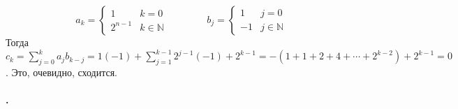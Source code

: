 \documentclass{article}
\begin{document}
\begin{itemize}
\begin{Example}
            $$a_k=\begin{cases}
                1 & k=0\\
                2^{n-1} & k\in\mathbb N
            \end{cases}\qquad\qquad b_j=\begin{cases}
                1 & j=0\\
                -1 & j\in\mathbb N
            \end{cases}$$
            Тогда $c_k=\sum\limits_{j=0}^k a_jb_{k-j}=1(-1)+\sum\limits_{j=1}^{k-1}2^{j-1}(-1)+2^{k-1}=-(1+1+2+4+\cdots+2^{k-2})+2^{k-1}=0$. Это, очевидно, сходится.
        \end{Example}
    \end{itemize}
    \paragraph{.}
\end{document}
